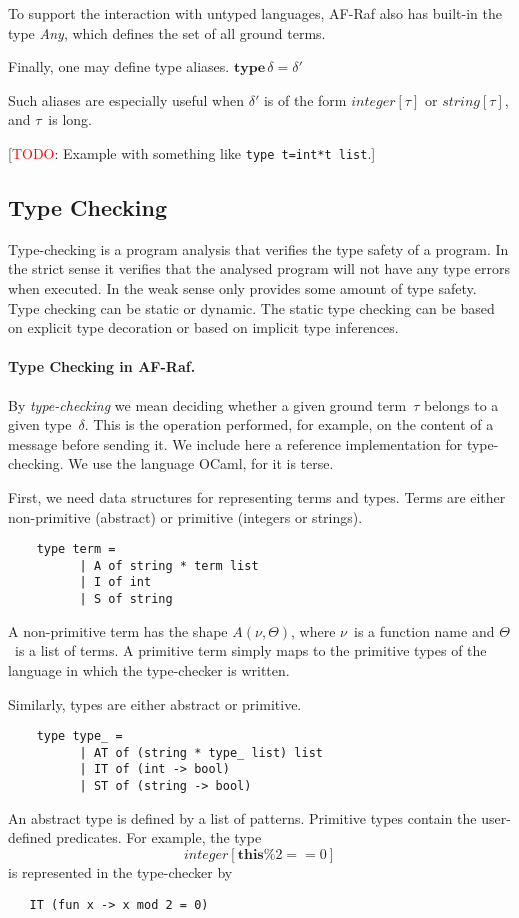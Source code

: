 \documentclass[a4paper,12pt,oneside,fleqn]{book} %
\newcommand{\todo}[1]{[\textcolor{red}{TODO}: #1]}
\begin{document}
To support the interaction with untyped languages, AF-Raf also has built-in
the type \textit{Any}, which defines the set of all ground terms.

Finally, one may define type aliases.
$\mathbf{type}\,\delta=\delta'$

Such aliases are especially useful when $\delta'$ is of the form
$\mathit{integer}[\tau]$ or $\mathit{string}[\tau]$, and $\tau$~is long.

\todo{Example with something like {\tt type t=int*t list}.}

\subsection{Type Checking} %
Type-checking is a program analysis that verifies the type safety of a
program. In the strict sense it verifies that the analysed program
will not have any type errors when executed. In the weak sense only
provides some amount of type safety. Type checking can be static or
dynamic. The static type checking can be based on explicit type decoration
or based on implicit type inferences.


\paragraph{Type Checking in AF-Raf.}
By \emph{type-checking} we mean deciding whether a given ground term~$\tau$
belongs to a given type~$\delta$. This is the operation performed, for
example, on the content of a message before sending it. We include here a
reference implementation for type-checking. We use the language OCaml, for
it is terse.

First, we need data structures for representing terms and types. Terms are
either non-primitive (abstract) or primitive (integers or strings).
\begin{verbatim}
    type term =
          | A of string * term list
          | I of int
          | S of string
\end{verbatim}
A non-primitive term has the shape $A(\nu,\Theta)$, where $\nu$~is a
function name and $\Theta$~is a list of terms. A primitive term simply maps
to the primitive types of the language in which the type-checker is
written.

Similarly, types are either abstract or primitive.
\begin{verbatim}
    type type_ =
          | AT of (string * type_ list) list
          | IT of (int -> bool)
          | ST of (string -> bool)
\end{verbatim}
An abstract type is defined by a list of patterns. Primitive types contain the
user-defined predicates. For example, the type
\[\mathit{integer}[\mathbf{this}\%2==0]\] is represented in the type-checker by
\begin{verbatim}
   IT (fun x -> x mod 2 = 0)
\end{verbatim}
\end{document}

